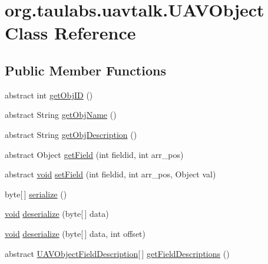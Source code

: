 \hypertarget{classorg_1_1taulabs_1_1uavtalk_1_1_u_a_v_object}{\section{org.\-taulabs.\-uavtalk.\-U\-A\-V\-Object \-Class \-Reference}
\label{classorg_1_1taulabs_1_1uavtalk_1_1_u_a_v_object}
}
\subsection*{\-Public \-Member \-Functions}
\begin{DoxyCompactItemize}
\item 
abstract int \hyperlink{classorg_1_1taulabs_1_1uavtalk_1_1_u_a_v_object_a9b1dc8d4596067de02880ffdf8473ae1}{get\-Obj\-I\-D} ()
\item 
abstract \-String \hyperlink{classorg_1_1taulabs_1_1uavtalk_1_1_u_a_v_object_acc8f62ae1a0b435d452ab6f02d05c522}{get\-Obj\-Name} ()
\item 
abstract \-String \hyperlink{classorg_1_1taulabs_1_1uavtalk_1_1_u_a_v_object_a73e7450e50b592456c09631410cd7977}{get\-Obj\-Description} ()
\item 
abstract \-Object \hyperlink{classorg_1_1taulabs_1_1uavtalk_1_1_u_a_v_object_a565f816432e849b2085b916985569470}{get\-Field} (int fieldid, int arr\-\_\-pos)
\item 
abstract \hyperlink{group___u_a_v_objects_plugin_ga444cf2ff3f0ecbe028adce838d373f5c}{void} \hyperlink{classorg_1_1taulabs_1_1uavtalk_1_1_u_a_v_object_adad546b53ff86f3f2c31a7288bbc4a0e}{set\-Field} (int fieldid, int arr\-\_\-pos, \-Object val)
\item 
byte\mbox{[}$\,$\mbox{]} \hyperlink{classorg_1_1taulabs_1_1uavtalk_1_1_u_a_v_object_a8751ce3ec9736eb071465670d10f6cdc}{serialize} ()
\item 
\hyperlink{group___u_a_v_objects_plugin_ga444cf2ff3f0ecbe028adce838d373f5c}{void} \hyperlink{classorg_1_1taulabs_1_1uavtalk_1_1_u_a_v_object_a395209efe65f8930125e3039da4018f9}{deserialize} (byte\mbox{[}$\,$\mbox{]} data)
\item 
\hyperlink{group___u_a_v_objects_plugin_ga444cf2ff3f0ecbe028adce838d373f5c}{void} \hyperlink{classorg_1_1taulabs_1_1uavtalk_1_1_u_a_v_object_abdc532e4be9759f978d5dbf9ec0f965f}{deserialize} (byte\mbox{[}$\,$\mbox{]} data, int offset)
\item 
abstract \*
\hyperlink{classorg_1_1taulabs_1_1uavtalk_1_1_u_a_v_object_field_description}{\-U\-A\-V\-Object\-Field\-Description}\mbox{[}$\,$\mbox{]} \hyperlink{classorg_1_1taulabs_1_1uavtalk_1_1_u_a_v_object_ae6480b4323ceb496c9ef036dfb28a312}{get\-Field\-Descriptions} ()

\end{DoxyCompactItemize}
